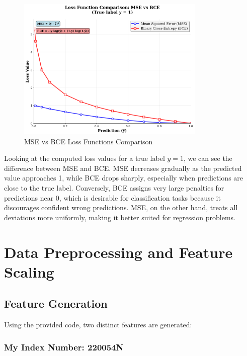 \documentclass[12pt]{article}
\begin{document}
\begin{figure}[H]
    \centering
    \includegraphics[width=0.8\textwidth]{resources/se_vs_bce.png}
    \caption{MSE vs BCE Loss Functions Comparison}
    \label{fig:mse_vs_bce}
\end{figure}

\vspace{0.5cm}

Looking at the computed loss values for a true label $y=1$, we can see the difference between MSE and BCE. MSE decreases gradually as the predicted value approaches 1, while BCE drops sharply, especially when predictions are close to the true label. Conversely, BCE assigns very large penalties for predictions near 0, which is desirable for classification tasks because it discourages confident wrong predictions. MSE, on the other hand, treats all deviations more uniformly, making it better suited for regression problems.

\newpage

\section{Data Preprocessing and Feature Scaling}

\subsection{Feature Generation}

Using the provided code, two distinct features are generated:
\subsubsection*{My Index Number: 220054N}
\end{document}
